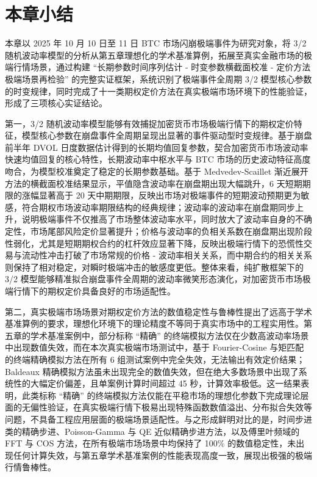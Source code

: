 \section{本章小结}
本章以 2025 年 10 月 10 日至 11 日 BTC 市场闪崩极端事件为研究对象，将 3/2 随机波动率模型的分析从第五章理想化的学术基准算例，拓展至真实金融市场的极端行情场景，通过构建 “长期参数时间序列估计 - 时变参数横截面校准 - 定价方法极端场景再检验” 的完整实证框架，系统识别了极端事件全周期 3/2 模型核心参数的时变规律，同时完成了十一类期权定价方法在真实极端市场环境下的性能验证，形成了三项核心实证结论。

第一，3/2 随机波动率模型能够有效捕捉加密货币市场极端行情下的期权定价特征，模型核心参数在崩盘事件全周期呈现出显著的事件驱动型时变规律。基于崩盘前半年 DVOL 日度数据估计得到的长期均值回复参数，契合加密货币市场波动率快速均值回复的核心特性，长期波动率中枢水平与 BTC 市场的历史波动特征高度吻合，为模型校准奠定了稳定的长期参数基础。基于 Medvedev-Scaillet 渐近展开方法的横截面校准结果显示，平值隐含波动率在崩盘期出现大幅跳升，6 天短期期限的涨幅显著高于 20 天中期期限，反映出市场对极端事件的短期波动预期更为敏感，符合期权市场波动率期限结构的经典规律；波动率的波动率在崩盘期同步上升，说明极端事件不仅推高了市场整体波动率水平，同时放大了波动率自身的不确定性，市场尾部风险定价显著提升；价格与波动率的负相关系数在崩盘期出现阶段性弱化，尤其是短期期权合约的杠杆效应显著下降，反映出极端行情下的恐慌性交易与流动性冲击打破了市场常规的价格 - 波动率相关关系，而中期合约的相关关系则保持了相对稳定，对瞬时极端冲击的敏感度更低。整体来看，纯扩散框架下的 3/2 模型能够精准拟合崩盘事件全周期的波动率微笑形态演化，对加密货币市场极端行情下的期权定价具备良好的市场适配性。

第二，真实极端市场场景对期权定价方法的数值稳定性与鲁棒性提出了远高于学术基准算例的要求，理想化环境下的理论精度不等同于真实市场中的工程实用性。第五章的学术基准案例中，部分标称 “精确” 的终端模拟方法仅在少数高波动率场景中出现数值失效，而在本次真实极端市场测试中，基于 Fourier-Cosine 与矩匹配的终端精确模拟方法在所有 6 组测试案例中完全失效，无法输出有效定价结果；Baldeaux 精确模拟方法虽未出现完全的数值失效，但在绝大多数场景中出现了系统性的大幅定价偏差，且单案例计算时间超过 45 秒，计算效率极低。这一结果表明，此类标称 “精确” 的终端模拟方法仅能在平稳市场的理想化参数下完成理论层面的无偏性验证，在真实极端行情下极易出现特殊函数数值溢出、分布拟合失效等问题，不具备工程应用层面的极端场景适配性。与之形成鲜明对比的是，时间步进类的精确步进、Poisson-Gamma 与 QE 近似精确步进方法，以及傅里叶频域的 FFT 与 COS 方法，在所有极端市场场景中均保持了 100\% 的数值稳定性，未出现任何计算失效，与第五章学术基准案例的性能表现高度一致，展现出极强的极端行情鲁棒性。

